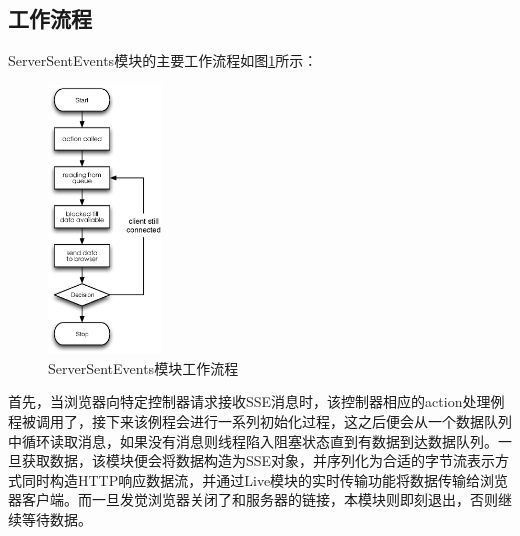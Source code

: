 \subsection{工作流程}
ServerSentEvents模块的主要工作流程如图\ref{fig-sses-process}所示：

\begin{figure}[h]
\centering
\includegraphics[width=0.27\textwidth]{images/detail/sse_process.eps}
\caption{ServerSentEvents模块工作流程}
\label{fig-sses-process}
\end{figure}

首先，当浏览器向特定控制器请求接收SSE消息时，该控制器相应的action处理例程被调用了，接下来该例程会进行一系列初始化过程，这之后便会从一个数据队列中循环读取消息，如果没有消息则线程陷入阻塞状态直到有数据到达数据队列。一旦获取数据，该模块便会将数据构造为SSE对象，并序列化为合适的字节流表示方式同时构造HTTP响应数据流，并通过Live模块的实时传输功能将数据传输给浏览器客户端。而一旦发觉浏览器关闭了和服务器的链接，本模块则即刻退出，否则继续等待数据。

